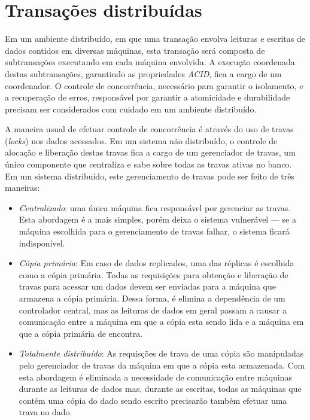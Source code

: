 \documentclass[11pt,twoside,a4paper]{book}
\begin{document}
\section{Transações distribuídas}
\label{sec:transacoes_distribuidas}
Em um ambiente distribuído, em que uma transação envolva leituras e escritas de dados contidos em diversas máquinas, esta transação será composta de subtransações executando em cada máquina envolvida. A execução coordenada destas subtransações, garantindo as propriedades \emph{ACID}, fica a cargo de um coordenador. O controle de concorrência, necessário para garantir o isolamento, e a recuperação de erros, responsável por garantir a atomicidade e durabilidade precisam ser considerados com cuidado em um ambiente distribuído.

A maneira usual de efetuar controle de concorrência é através do uso de travas (\emph{locks}) nos dados acessados. Em um sistema não distribuído, o controle de alocação e liberação destas travas fica a cargo de um gerenciador de travas, um único componente que centraliza e sabe sobre todas as travas ativas no banco. Em um sistema distribuído, este gerenciamento de travas pode ser feito de três maneiras:
\begin{itemize}
\item \emph{Centralizado}: uma única máquina fica responsável por gerenciar as travas. Esta abordagem é a mais simples, porém deixa o sistema vulnerável --- se a máquina escolhida para o gerenciamento de travas falhar, o sistema ficará indisponível.
\item \emph{Cópia primária}: Em caso de dados replicados, uma das réplicas é escolhida como a cópia primária. Todas as requisições para obtenção e liberação de travas para acessar um dados devem ser enviadas para a máquina que armazena a cópia primária. Dessa forma, é elimina a dependência de um controlador central, mas as leituras de dados em geral passam a causar a comunicação entre a máquina em que a cópia esta sendo lida e a máquina em que a cópia primária de encontra.
\item \emph{Totalmente distribuído}: As requisções de trava de uma cópia são manipuladas pelo gerenciador de travas da máquina em que a cópia esta armazenada. Com esta abordagem é eliminada a necessidade de comunicação entre máquinas durante as leituras de dados mas, durante as escritas, todas as máquinas que contém uma cópia do dado sendo escrito precisarão também efetuar uma trava no dado.
\end{itemize}
\end{document}
